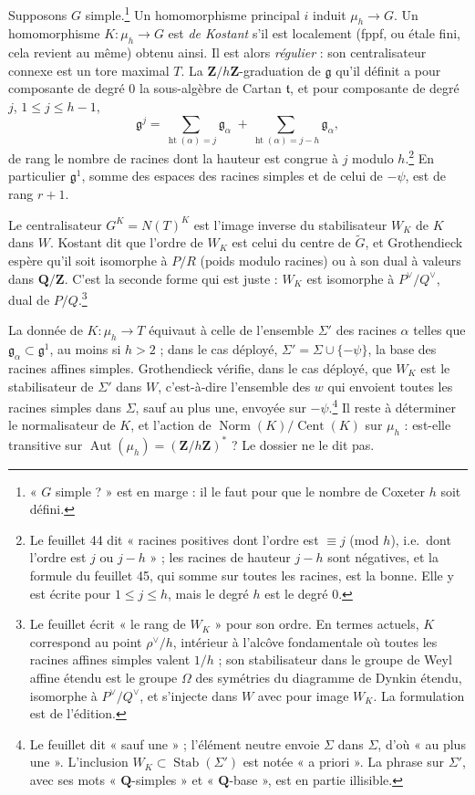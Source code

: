 \documentclass[11pt,a4paper]{article}
\begin{document}
Supposons $G$ simple.\footnote{« $G$ simple ? » est en marge : il le faut pour
que le nombre de Coxeter $h$ soit défini.} Un homomorphisme principal $i$
induit $\mu_{h}\to G$. Un homomorphisme $K\colon\mu_{h}\to G$ est \emph{de
Kostant} s'il est localement (fppf, ou étale fini, cela revient au même)
obtenu ainsi. Il est alors \emph{régulier} : son centralisateur connexe est un
tore maximal $T$. La $\mathbf{Z}/h\mathbf{Z}$-graduation de $\mathfrak{g}$
qu'il définit a pour composante de degré $0$ la sous-algèbre de Cartan
$\mathfrak{t}$, et pour composante de degré $j$, $1\leqslant j\leqslant h-1$,
\[
  \mathfrak{g}^{j}=\sum_{\operatorname{ht}(\alpha)=j}\mathfrak{g}_{\alpha}
  \;+\sum_{\operatorname{ht}(\alpha)=j-h}\mathfrak{g}_{\alpha},
\]
de rang le nombre de racines dont la hauteur est congrue à $j$ modulo
$h$.\footnote{Le feuillet 44 dit « racines positives dont l'ordre est $\equiv j$
(mod $h$), i.e.\ dont l'ordre est $j$ ou $j-h$ » ; les racines de hauteur
$j-h$ sont négatives, et la formule du feuillet 45, qui somme sur toutes les
racines, est la bonne. Elle y est écrite pour $1\leqslant j\leqslant h$, mais
le degré $h$ est le degré $0$.} En particulier $\mathfrak{g}^{1}$, somme des
espaces des racines simples et de celui de $-\psi$, est de rang $r+1$.

Le centralisateur $G^{K}=N(T)^{K}$ est l'image inverse du stabilisateur $W_{K}$
de $K$ dans $W$. Kostant dit que l'ordre de $W_{K}$ est celui du centre de
$\widetilde{G}$, et Grothendieck espère qu'il soit isomorphe à $P/R$ (poids
modulo racines) ou à son dual à valeurs dans $\mathbf{Q}/\mathbf{Z}$. C'est la
seconde forme qui est juste : $W_{K}$ est isomorphe à $P^{\vee}/Q^{\vee}$,
dual de $P/Q$.\footnote{Le feuillet écrit « le rang de $W_{K}$ » pour son
ordre. En termes actuels, $K$ correspond au point $\rho^{\vee}/h$, intérieur à
l'alcôve fondamentale où toutes les racines affines simples valent $1/h$ ; son
stabilisateur dans le groupe de Weyl affine étendu est le groupe $\Omega$ des
symétries du diagramme de Dynkin étendu, isomorphe à $P^{\vee}/Q^{\vee}$, et
s'injecte dans $W$ avec pour image $W_{K}$. La formulation est de l'édition.}

La donnée de $K\colon\mu_{h}\to T$ équivaut à celle de l'ensemble $\Sigma'$ des
racines $\alpha$ telles que $\mathfrak{g}_{\alpha}\subset\mathfrak{g}^{1}$, au
moins si $h>2$ ; dans le cas déployé, $\Sigma'=\Sigma\cup\{-\psi\}$, la base
des racines affines simples. Grothendieck vérifie, dans le cas déployé, que
$W_{K}$ est le stabilisateur de $\Sigma'$ dans $W$, c'est-à-dire l'ensemble des
$w$ qui envoient toutes les racines simples dans $\Sigma$, sauf au plus une,
envoyée sur $-\psi$.\footnote{Le feuillet dit « sauf une » ; l'élément neutre
envoie $\Sigma$ dans $\Sigma$, d'où « au plus une ». L'inclusion $W_{K}\subset
\operatorname{Stab}(\Sigma')$ est notée « a priori ». La phrase sur
$\Sigma'$, avec ses mots « $\mathbf{Q}$-simples » et « $\mathbf{Q}$-base »,
est en partie illisible.} Il reste à déterminer le normalisateur de $K$, et
l'action de $\operatorname{Norm}(K)/\operatorname{Cent}(K)$ sur $\mu_{h}$ :
est-elle transitive sur $\operatorname{Aut}(\mu_{h})=
(\mathbf{Z}/h\mathbf{Z})^{*}$ ? Le dossier ne le dit pas.
\end{document}
